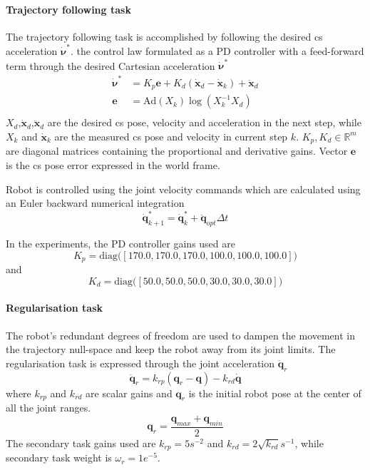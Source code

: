 \paragraph*{Trajectory following task} The trajectory following task is accomplished by following the desired \gls{cs} acceleration $\dot{\bm{\nu}}^*$. the control law formulated as a PD controller with a feed-forward term through the desired Cartesian acceleration $\dot{\bm{\nu}}^*$
\begin{equation}
\begin{split}
    \dot{\bm{\nu}}^* &= K_p \bm{e} + K_d(\dot{\bm{x}}_{d} - \dot{\bm{x}}_k) + \ddot{\bm{x}}_{d} \\
    \bm{e} &= \text{Ad}(X_k) \log(X_k^{-1}X_{d})\\
\end{split}
\end{equation}
$X_d$,$\dot{\bm{x}}_d$,$\ddot{\bm{x}}_d$ are the desired \gls{cs} pose, velocity and acceleration in the next step, while $X_{k}$ and $\dot{\bm{x}}_{k}$ are the measured \gls{cs} pose and velocity in current step $k$. $K_p,K_d\in \mathbb{R}^m$ are diagonal matrices containing the proportional and derivative gains. Vector $\bm{e}$ is the \gls{cs} pose error expressed in the world frame. 

Robot is controlled using the joint velocity commands which are calculated using an Euler backward numerical integration
\begin{equation}
\dot{\bm{q}}^*_{k+1} = \dot{\bm{q}}^*_{k} +  \ddot{\bm{q}}_{opt}\Delta t  
\end{equation}

In the experiments, the PD controller gains used are $$K_p=\text{diag}\big([170.0, 170.0, 170.0, 100.0, 100.0, 100.0]\big)$$ and $$K_d=\text{diag}\big([50.0, 50.0, 50.0, 30.0, 30.0, 30.0]\big)$$

\paragraph*{Regularisation task}  The robot's redundant degrees of freedom are used to dampen the movement in the trajectory null-space and keep the robot away from its joint limits. The regularisation task is expressed through the joint acceleration $\ddot{\bm{q}}_r$
\begin{equation}
    \ddot{\bm{q}}_r = k_{rp}(\bm{q}_{r} - \bm{q}) - k_{rd}\dot{\bm{q}}
\end{equation}
where $k_{rp}$ and $k_{rd}$ are scalar gains and $\bm{q}_{r}$ is the initial robot pose at the center of all the joint ranges.
$$
\bm{q}_r = \frac{\bm{q}_{max}+\bm{q}_{min}}{2}
$$
The secondary task gains used are $k_{rp}=5 s^{-2}$ and $k_{rd}=2\sqrt{k_{rd}}s^{-1}$, while secondary task weight is $\omega_r=1e^{-5}$.



